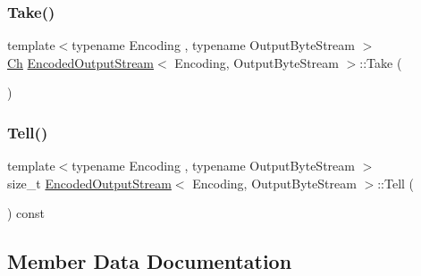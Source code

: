 \mbox{\label{classEncodedOutputStream_a90f5a5e1598316a417ef5b6ad3d49f36}} 
\subsubsection{\texorpdfstring{Take()}{Take()}}
{\footnotesize\ttfamily template$<$typename Encoding , typename Output\+Byte\+Stream $>$ \\
\hyperlink{classEncodedOutputStream_aa8f494d7ee2808307fbc9cd658c0f760}{Ch} \hyperlink{classEncodedOutputStream}{Encoded\+Output\+Stream}$<$ Encoding, Output\+Byte\+Stream $>$\+::Take (\begin{DoxyParamCaption}{ }\end{DoxyParamCaption})\hspace{0.3cm}{\ttfamily [inline]}}

\mbox{\label{classEncodedOutputStream_a1c6f6d51999b8d04e4d81d92ff725dbc}} 
\subsubsection{\texorpdfstring{Tell()}{Tell()}}
{\footnotesize\ttfamily template$<$typename Encoding , typename Output\+Byte\+Stream $>$ \\
size\+\_\+t \hyperlink{classEncodedOutputStream}{Encoded\+Output\+Stream}$<$ Encoding, Output\+Byte\+Stream $>$\+::Tell (\begin{DoxyParamCaption}{ }\end{DoxyParamCaption}) const\hspace{0.3cm}{\ttfamily [inline]}}



\subsection{Member Data Documentation}
\mbox{\label{classEncodedOutputStream_a92839793e0a22a1da7a9008187728746}} 
